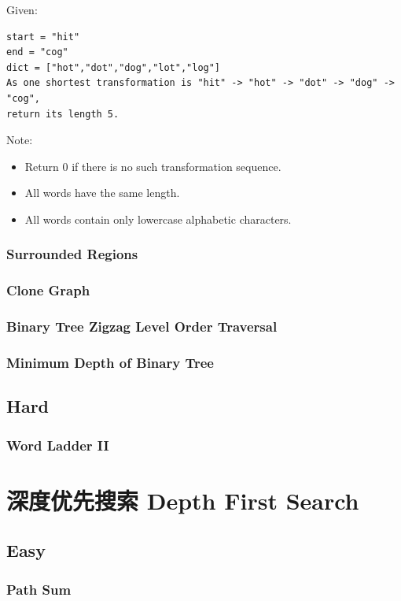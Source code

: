 \documentclass[11pt]{book}
\begin{document}
Given:
\lstset{language=java,label= ,caption= ,numbers=none}
\begin{lstlisting}
start = "hit"
end = "cog"
dict = ["hot","dot","dog","lot","log"]
As one shortest transformation is "hit" -> "hot" -> "dot" -> "dog" -> "cog",
return its length 5.
\end{lstlisting}
Note:
\begin{itemize}
\item Return 0 if there is no such transformation sequence.
\item All words have the same length.
\item All words contain only lowercase alphabetic characters.
\end{itemize}
\subsection{Surrounded Regions}
\label{sec-7-2-2}
\subsection{Clone Graph}
\label{sec-7-2-3}
\subsection{Binary Tree Zigzag Level Order Traversal}
\label{sec-7-2-4}
\subsection{Minimum Depth of Binary Tree}
\label{sec-7-2-5}

\section{Hard}
\label{sec-7-3}
\subsection{Word Ladder II}
\label{sec-7-3-1}

\chapter{深度优先搜索 Depth First Search}
\label{sec-8}
\section{Easy}
\label{sec-8-1}
\subsection{Path Sum}
\label{sec-8-1-1}
\end{document}
